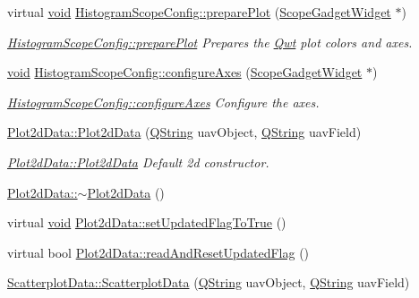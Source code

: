 \begin{DoxyCompactItemize}
virtual \hyperlink{group___u_a_v_objects_plugin_ga444cf2ff3f0ecbe028adce838d373f5c}{void} \hyperlink{group___scope_plugin_gaaf43bfcb7e79e657acda463cb66d854c}{Histogram\-Scope\-Config\-::prepare\-Plot} (\hyperlink{class_scope_gadget_widget}{Scope\-Gadget\-Widget} $\ast$)
\begin{DoxyCompactList}\small\item\em \hyperlink{group___scope_plugin_gaaf43bfcb7e79e657acda463cb66d854c}{Histogram\-Scope\-Config\-::prepare\-Plot} Prepares the \hyperlink{namespace_qwt}{Qwt} plot colors and axes. \end{DoxyCompactList}\item 
\hyperlink{group___u_a_v_objects_plugin_ga444cf2ff3f0ecbe028adce838d373f5c}{void} \hyperlink{group___scope_plugin_ga522d6d5e834566550cacdb1eb24b934f}{Histogram\-Scope\-Config\-::configure\-Axes} (\hyperlink{class_scope_gadget_widget}{Scope\-Gadget\-Widget} $\ast$)
\begin{DoxyCompactList}\small\item\em \hyperlink{group___scope_plugin_ga522d6d5e834566550cacdb1eb24b934f}{Histogram\-Scope\-Config\-::configure\-Axes} Configure the axes. \end{DoxyCompactList}\item 
\hyperlink{group___scope_plugin_ga47355d48ebe2a3f10f3eeb8c885d91d2}{Plot2d\-Data\-::\-Plot2d\-Data} (\hyperlink{group___u_a_v_objects_plugin_gab9d252f49c333c94a72f97ce3105a32d}{Q\-String} uav\-Object, \hyperlink{group___u_a_v_objects_plugin_gab9d252f49c333c94a72f97ce3105a32d}{Q\-String} uav\-Field)
\begin{DoxyCompactList}\small\item\em \hyperlink{group___scope_plugin_ga47355d48ebe2a3f10f3eeb8c885d91d2}{Plot2d\-Data\-::\-Plot2d\-Data} Default 2d constructor. \end{DoxyCompactList}\item 
\hyperlink{group___scope_plugin_ga7e60665e7c88b1df55cfefe356d8ee27}{Plot2d\-Data\-::$\sim$\-Plot2d\-Data} ()
\item 
virtual \hyperlink{group___u_a_v_objects_plugin_ga444cf2ff3f0ecbe028adce838d373f5c}{void} \hyperlink{group___scope_plugin_ga8cf81c5a6f87fc1c97b0054f2cb23f90}{Plot2d\-Data\-::set\-Updated\-Flag\-To\-True} ()
\item 
virtual bool \hyperlink{group___scope_plugin_ga5fe24bb29fc32dfa2f955383dc96877e}{Plot2d\-Data\-::read\-And\-Reset\-Updated\-Flag} ()
\item 
\hyperlink{group___scope_plugin_ga1e171be371a5e44f814dc012e182f99b}{Scatterplot\-Data\-::\-Scatterplot\-Data} (\hyperlink{group___u_a_v_objects_plugin_gab9d252f49c333c94a72f97ce3105a32d}{Q\-String} uav\-Object, \hyperlink{group___u_a_v_objects_plugin_gab9d252f49c333c94a72f97ce3105a32d}{Q\-String} uav\-Field)

\end{DoxyCompactItemize}
